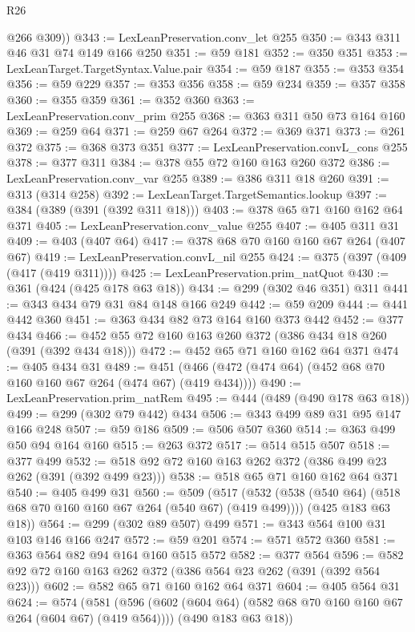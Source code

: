 \begin{lexlean}{R26}
\begin{coremodule}
        @266
        @309))
@343 := LexLeanPreservation.conv_let @255
@350 := @343 @311 @46 @31 @74 @149 @166 @250
@351 := @59 @181
@352 := @350 @351
@353 := LexLeanTarget.TargetSyntax.Value.pair
@354 := @59 @187
@355 := @353 @354
@356 := @59 @229
@357 := @353 @356
@358 := @59 @234
@359 := @357 @358
@360 := @355 @359
@361 := @352 @360
@363 := LexLeanPreservation.conv_prim @255
@368 := @363 @311 @50 @73 @164 @160
@369 := @259 @64
@371 := @259 @67 @264
@372 := @369 @371
@373 := @261 @372
@375 := @368 @373 @351
@377 := LexLeanPreservation.convL_cons @255
@378 := @377 @311
@384 := @378 @55 @72 @160 @163 @260 @372
@386 := LexLeanPreservation.conv_var @255
@389 := @386 @311 @18 @260
@391 := @313 (@314 @258)
@392 := LexLeanTarget.TargetSemantics.lookup
@397 := @384 (@389 (@391 (@392 @311 @18)))
@403 := @378 @65 @71 @160 @162 @64 @371
@405 := LexLeanPreservation.conv_value @255
@407 := @405 @311 @31
@409 := @403 (@407 @64)
@417 := @378 @68 @70 @160 @160 @67 @264 (@407 @67)
@419 := LexLeanPreservation.convL_nil @255
@424 := @375 (@397 (@409 (@417 (@419 @311))))
@425 := LexLeanPreservation.prim_natQuot
@430 := @361 (@424 (@425 @178 @63 @18))
@434 := @299 (@302 @46 @351) @311
@441 := @343 @434 @79 @31 @84 @148 @166 @249
@442 := @59 @209
@444 := @441 @442 @360
@451 := @363 @434 @82 @73 @164 @160 @373 @442
@452 := @377 @434
@466 := @452 @55 @72 @160 @163 @260 @372 (@386 @434 @18 @260 (@391 (@392 @434 @18)))
@472 := @452 @65 @71 @160 @162 @64 @371
@474 := @405 @434 @31
@489 := @451 (@466 (@472 (@474 @64) (@452 @68 @70 @160 @160 @67 @264 (@474 @67) (@419 @434))))
@490 := LexLeanPreservation.prim_natRem
@495 := @444 (@489 (@490 @178 @63 @18))
@499 := @299 (@302 @79 @442) @434
@506 := @343 @499 @89 @31 @95 @147 @166 @248
@507 := @59 @186
@509 := @506 @507 @360
@514 := @363 @499 @50 @94 @164 @160
@515 := @263 @372
@517 := @514 @515 @507
@518 := @377 @499
@532 := @518 @92 @72 @160 @163 @262 @372 (@386 @499 @23 @262 (@391 (@392 @499 @23)))
@538 := @518 @65 @71 @160 @162 @64 @371
@540 := @405 @499 @31
@560 := @509
    (@517
      (@532 (@538 (@540 @64) (@518 @68 @70 @160 @160 @67 @264 (@540 @67) (@419 @499))))
      (@425 @183 @63 @18))
@564 := @299 (@302 @89 @507) @499
@571 := @343 @564 @100 @31 @103 @146 @166 @247
@572 := @59 @201
@574 := @571 @572 @360
@581 := @363 @564 @82 @94 @164 @160 @515 @572
@582 := @377 @564
@596 := @582 @92 @72 @160 @163 @262 @372 (@386 @564 @23 @262 (@391 (@392 @564 @23)))
@602 := @582 @65 @71 @160 @162 @64 @371
@604 := @405 @564 @31
@624 := @574
    (@581
      (@596 (@602 (@604 @64) (@582 @68 @70 @160 @160 @67 @264 (@604 @67) (@419 @564))))
      (@490 @183 @63 @18))

\end{coremodule}
\end{lexlean}
